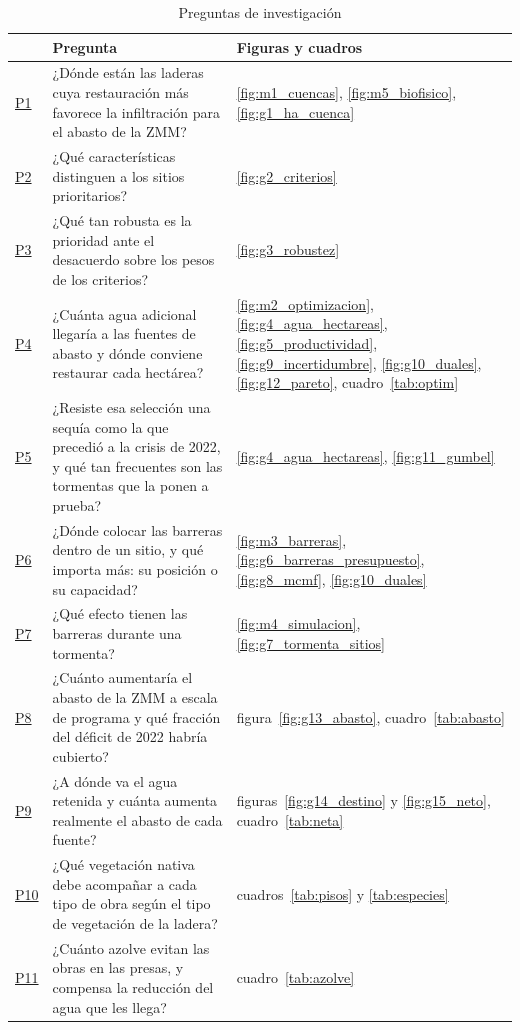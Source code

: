 \begin{table}[H]\centering\small
\caption{Preguntas de investigación}\label{tab:preguntas}
\begin{tabularx}{\linewidth}{lXl}
\toprule
 & Pregunta & Figuras y cuadros \\
\midrule
\hyperref[res:p1]{P1} & ¿Dónde están las laderas cuya restauración más favorece la infiltración para el abasto de la ZMM? & \ref{fig:m1_cuencas}, \ref{fig:m5_biofisico}, \ref{fig:g1_ha_cuenca} \\
\hyperref[res:p2]{P2} & ¿Qué características distinguen a los sitios prioritarios? & \ref{fig:g2_criterios} \\
\hyperref[res:p3]{P3} & ¿Qué tan robusta es la prioridad ante el desacuerdo sobre los pesos de los criterios? & \ref{fig:g3_robustez} \\
\hyperref[res:p4]{P4} & ¿Cuánta agua adicional llegaría a las fuentes de abasto y dónde conviene restaurar cada hectárea? & \ref{fig:m2_optimizacion}, \ref{fig:g4_agua_hectareas}, \ref{fig:g5_productividad}, \ref{fig:g9_incertidumbre}, \ref{fig:g10_duales}, \ref{fig:g12_pareto}, cuadro~\ref{tab:optim} \\
\hyperref[res:p5]{P5} & ¿Resiste esa selección una sequía como la que precedió a la crisis de 2022, y qué tan frecuentes son las tormentas que la ponen a prueba? & \ref{fig:g4_agua_hectareas}, \ref{fig:g11_gumbel} \\
\hyperref[res:p6]{P6} & ¿Dónde colocar las barreras dentro de un sitio, y qué importa más: su posición o su capacidad? & \ref{fig:m3_barreras}, \ref{fig:g6_barreras_presupuesto}, \ref{fig:g8_mcmf}, \ref{fig:g10_duales} \\
\hyperref[res:p7]{P7} & ¿Qué efecto tienen las barreras durante una tormenta? & \ref{fig:m4_simulacion}, \ref{fig:g7_tormenta_sitios} \\
\hyperref[res:p8]{P8} & ¿Cuánto aumentaría el abasto de la ZMM a escala de programa y qué fracción del déficit de 2022 habría cubierto? & figura~\ref{fig:g13_abasto}, cuadro~\ref{tab:abasto} \\
\hyperref[res:p9]{P9} & ¿A dónde va el agua retenida y cuánta aumenta realmente el abasto de cada fuente? & figuras~\ref{fig:g14_destino} y \ref{fig:g15_neto}, cuadro~\ref{tab:neta} \\
\hyperref[res:p10]{P10} & ¿Qué vegetación nativa debe acompañar a cada tipo de obra según el tipo de vegetación de la ladera? & cuadros~\ref{tab:pisos} y \ref{tab:especies} \\
\hyperref[res:p11]{P11} & ¿Cuánto azolve evitan las obras en las presas, y compensa la reducción del agua que les llega? & cuadro~\ref{tab:azolve} \\

\end{tabularx}
\end{table}
